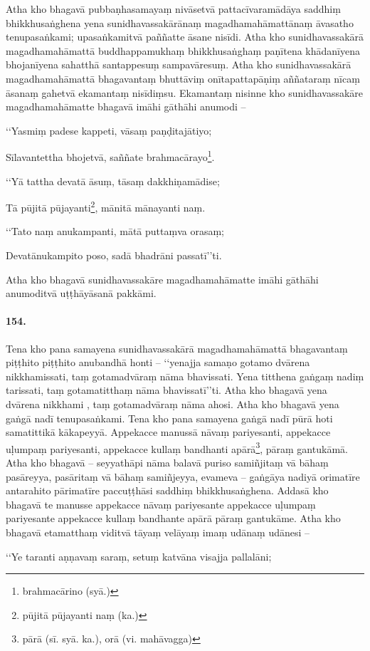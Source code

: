 Atha kho bhagavā pubbaṇhasamayaṃ nivāsetvā pattacīvaramādāya saddhiṃ bhikkhusaṅghena yena sunidhavassakārānaṃ magadhamahāmattānaṃ āvasatho tenupasaṅkami; upasaṅkamitvā paññatte āsane nisīdi. Atha kho sunidhavassakārā magadhamahāmattā buddhappamukhaṃ bhikkhusaṅghaṃ paṇītena khādanīyena bhojanīyena sahatthā santappesuṃ sampavāresuṃ. Atha kho sunidhavassakārā magadhamahāmattā bhagavantaṃ bhuttāviṃ onītapattapāṇiṃ aññataraṃ nīcaṃ āsanaṃ gahetvā ekamantaṃ nisīdiṃsu. Ekamantaṃ nisinne kho sunidhavassakāre magadhamahāmatte bhagavā imāhi gāthāhi anumodi –

‘‘Yasmiṃ padese kappeti, vāsaṃ paṇḍitajātiyo;

Sīlavantettha bhojetvā, saññate brahmacārayo\footnote{brahmacārino (syā.)}.

‘‘Yā tattha devatā āsuṃ, tāsaṃ dakkhiṇamādise;

Tā pūjitā pūjayanti\footnote{pūjitā pūjayanti naṃ (ka.)}, mānitā mānayanti naṃ.

‘‘Tato naṃ anukampanti, mātā puttaṃva orasaṃ;

Devatānukampito poso, sadā bhadrāni passatī’’ti.

Atha kho bhagavā sunidhavassakāre magadhamahāmatte imāhi gāthāhi anumoditvā uṭṭhāyāsanā pakkāmi.

\paragraph{154.} Tena kho pana samayena sunidhavassakārā magadhamahāmattā bhagavantaṃ piṭṭhito piṭṭhito anubandhā honti – ‘‘yenajja samaṇo gotamo dvārena nikkhamissati, taṃ gotamadvāraṃ nāma bhavissati. Yena titthena gaṅgaṃ nadiṃ tarissati, taṃ gotamatitthaṃ nāma bhavissatī’’ti. Atha kho bhagavā yena dvārena nikkhami , taṃ gotamadvāraṃ nāma ahosi. Atha kho bhagavā yena gaṅgā nadī tenupasaṅkami. Tena kho pana samayena gaṅgā nadī pūrā hoti samatittikā kākapeyyā. Appekacce manussā nāvaṃ pariyesanti, appekacce uḷumpaṃ pariyesanti, appekacce kullaṃ bandhanti apārā\footnote{pārā (sī. syā. ka.), orā (vi. mahāvagga)}, pāraṃ gantukāmā. Atha kho bhagavā – seyyathāpi nāma balavā puriso samiñjitaṃ vā bāhaṃ pasāreyya, pasāritaṃ vā bāhaṃ samiñjeyya, evameva – gaṅgāya nadiyā orimatīre antarahito pārimatīre paccuṭṭhāsi saddhiṃ bhikkhusaṅghena. Addasā kho bhagavā te manusse appekacce nāvaṃ pariyesante appekacce uḷumpaṃ pariyesante appekacce kullaṃ bandhante apārā pāraṃ gantukāme. Atha kho bhagavā etamatthaṃ viditvā tāyaṃ velāyaṃ imaṃ udānaṃ udānesi –

‘‘Ye taranti aṇṇavaṃ saraṃ, setuṃ katvāna visajja pallalāni;

